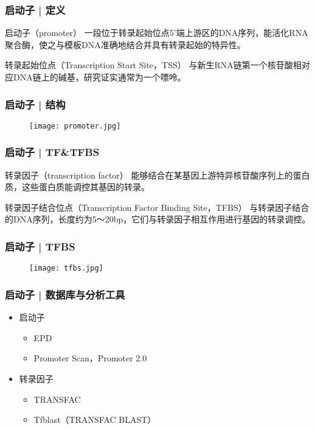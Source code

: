 \begin{frame}
	\frametitle{启动子 | 定义}
	\begin{block}{启动子（promoter）}
		一段位于转录起始位点5'端上游区的DNA序列，能活化RNA聚合酶，使之与模板DNA准确地结合并具有转录起始的特异性。
	\end{block}
	\pause
	\begin{block}{转录起始位点（Transcription Start Site，TSS）}
		与新生RNA链第一个核苷酸相对应DNA链上的碱基，研究证实通常为一个嘌呤。
	\end{block}
\end{frame}

\begin{frame}
	\frametitle{启动子 | 结构}
	\begin{figure}
		\centering
		\texttt{[image: promoter.jpg]}
	\end{figure}
\end{frame}

\begin{frame}
	\frametitle{启动子 | TF\&TFBS}
	\begin{block}{转录因子（transcription factor）}
		能够结合在某基因上游特异核苷酸序列上的蛋白质，这些蛋白质能调控其基因的转录。
	\end{block}
	\pause
	\begin{block}{转录因子结合位点（Transcription Factor Binding Site，TFBS）}
		与转录因子结合的DNA序列，长度约为5～20bp，它们与转录因子相互作用进行基因的转录调控。
	\end{block}
\end{frame}

\begin{frame}
	\frametitle{启动子 | TFBS}
	\begin{figure}
		\centering
		\texttt{[image: tfbs.jpg]}
	\end{figure}
\end{frame}

\begin{frame}
	\frametitle{启动子 | 数据库与分析工具}
	\begin{itemize}
		\item 启动子
			\begin{itemize}
				\item EPD
				\item Promoter Scan，Promoter 2.0
			\end{itemize}
		\item 转录因子
			\begin{itemize}
				\item TRANSFAC 
				\item Tfblast（TRANSFAC BLAST）
			\end{itemize}
	\end{itemize}
\end{frame}

